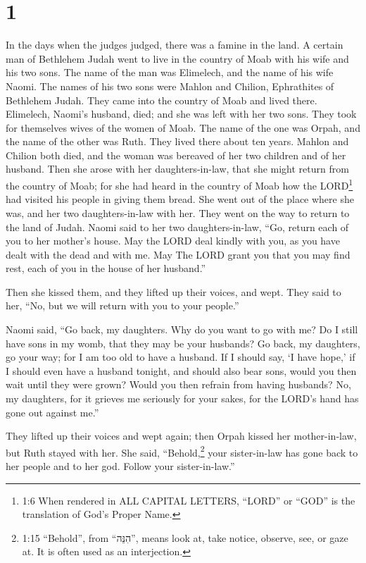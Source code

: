 \hypertarget{section}{%
\section{1}\label{section}}

 In the days when the judges judged, there was a famine in
the land. A certain man of Bethlehem Judah went to live in the country
of Moab with his wife and his two sons.  The name of the man
was Elimelech, and the name of his wife Naomi. The names of his two sons
were Mahlon and Chilion, Ephrathites of Bethlehem Judah. They came into
the country of Moab and lived there.  Elimelech, Naomi's
husband, died; and she was left with her two sons.  They
took for themselves wives of the women of Moab. The name of the one was
Orpah, and the name of the other was Ruth. They lived there about ten
years.  Mahlon and Chilion both died, and the woman was
bereaved of her two children and of her husband.  Then she
arose with her daughters-in-law, that she might return from the country
of Moab; for she had heard in the country of Moab how the
LORD\footnote{1:6 When rendered in ALL CAPITAL LETTERS, ``LORD'' or
  ``GOD'' is the translation of God's Proper Name.} had visited his
people in giving them bread.  She went out of the place
where she was, and her two daughters-in-law with her. They went on the
way to return to the land of Judah.  Naomi said to her two
daughters-in-law, ``Go, return each of you to her mother's house. May
the LORD deal kindly with you, as you have dealt with the dead and with
me.  May The LORD grant you that you may find rest, each of
you in the house of her husband.''

Then she kissed them, and they lifted up their voices, and wept.
 They said to her, ``No, but we will return with you to
your people.''

 Naomi said, ``Go back, my daughters. Why do you want to go
with me? Do I still have sons in my womb, that they may be your
husbands?  Go back, my daughters, go your way; for I am too
old to have a husband. If I should say, `I have hope,' if I should even
have a husband tonight, and should also bear sons,  would
you then wait until they were grown? Would you then refrain from having
husbands? No, my daughters, for it grieves me seriously for your sakes,
for the LORD's hand has gone out against me.''

 They lifted up their voices and wept again; then Orpah
kissed her mother-in-law, but Ruth stayed with her.  She
said, ``Behold,\footnote{1:15 ``Behold'', from ``הִנֵּה'', means look
  at, take notice, observe, see, or gaze at. It is often used as an
  interjection.} your sister-in-law has gone back to her people and to
her god. Follow your sister-in-law.''

